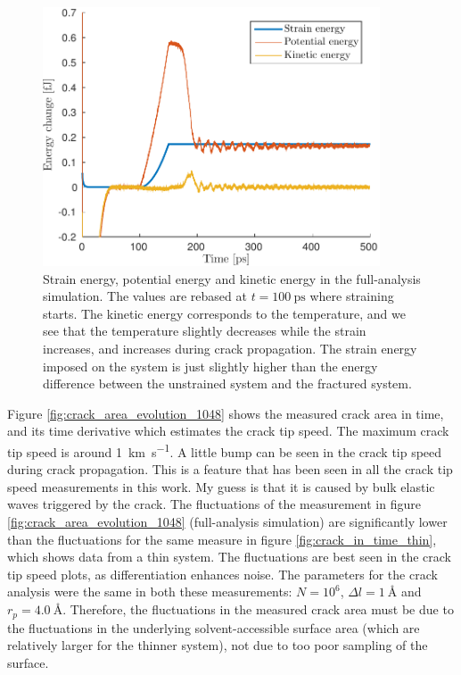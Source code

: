 \begin{figure}
\centering
\includegraphics[width=10cm]{../figures/thesis/strain_pot_kin_eng_1048_24_24_12.pdf}
\caption{Strain energy, potential energy and kinetic energy in the full-analysis simulation. The values are rebased at $t=\SI{100}{\pico\second}$ where straining starts. The kinetic energy corresponds to the temperature, and we see that the temperature slightly decreases while the strain increases, and increases during crack propagation. The strain energy imposed on the system is just slightly higher than the energy difference between the unstrained system and the fractured system.}
\label{fig:energy_1048}
\end{figure}

Figure \ref{fig:crack_area_evolution_1048} shows the measured crack area in time, and its time derivative which estimates the crack tip speed. The maximum crack tip speed is around \SI{1}{\kilo\meter\per\second}. A little bump can be seen in the crack tip speed during crack propagation. This is a feature that has been seen in all the crack tip speed measurements in this work. My guess is that it is caused by bulk elastic waves triggered by the crack. The fluctuations of the measurement in figure \ref{fig:crack_area_evolution_1048} (full-analysis simulation) are significantly lower than the fluctuations for the same measure in figure \ref{fig:crack_in_time_thin}, which shows data from a thin system. The fluctuations are best seen in the crack tip speed plots, as differentiation enhances noise. The parameters for the crack analysis were the same in both these measurements: $N = 10^6$, $\Delta l = \SI{1}{\angstrom}$ and $r_p = \SI{4.0}{\angstrom}$. Therefore, the fluctuations in the measured crack area must be due to the fluctuations in the underlying solvent-accessible surface area (which are relatively larger for the thinner system), not due to too poor sampling of the surface. 


